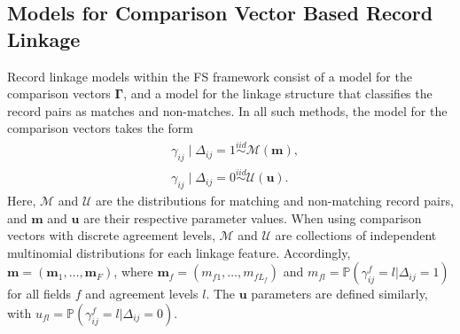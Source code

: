 \documentclass[12pt,letterpaper]{article}
\newcommand{\1}[1]{\mathbb{I}\!\left[#1\right]} %
\begin{document}
\subsection{Models for Comparison Vector Based Record Linkage}\label{sec:model-review}

Record linkage models within the FS framework consist of a model for the comparison vectors $\bm{\Gamma}$, and a model for the linkage structure that classifies the record pairs as matches and non-matches. In all such methods, the model for the comparison vectors takes the form
	\begin{align*}
		&\gamma_{ij} \mid \Delta_{ij} = 1 \stackrel{iid}{\sim} \mathcal{M}(\bm{m}),  \\
		&\gamma_{ij} \mid \Delta_{ij} = 0  \stackrel{iid}{\sim} \mathcal{U}(\bm{u}).
	\end{align*}
Here, $\mathcal{M}$ and $\mathcal{U}$ are the distributions for matching and non-matching record pairs, and $\bm{m}$ and $\bm{u}$ are their respective parameter values. When using comparison vectors with discrete agreement levels, $\mathcal{M}$ and $\mathcal{U}$ are collections of independent multinomial distributions for each linkage feature. Accordingly, $\bm{m} = (\bm{m}_1, \ldots, \bm{m}_F)$, where $\bm{m}_f = (m_{f1}, \ldots, m_{fL_f})$ and $m_{fl} = \mathbb{P}(\gamma_{ij}^f = l|\Delta_{ij} = 1)$ for all fields $f$ and agreement levels $l$. The $\bm{u}$ parameters are defined similarly, with $u_{fl} = \mathbb{P}(\gamma_{ij}^f = l|\Delta_{ij} = 0)$. 
\end{document}
